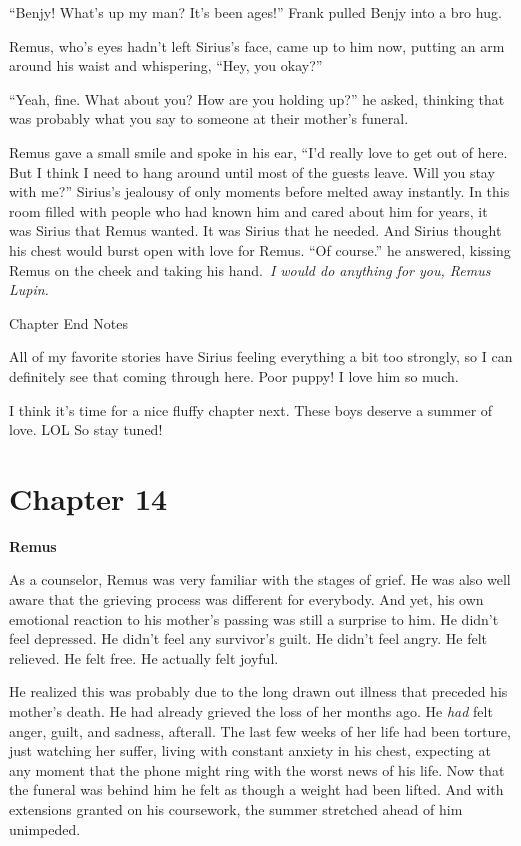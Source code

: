 \documentclass[12pt,twoside,openright]{memoir}
\begin{document}
``Benjy! What's up my man? It's been ages!'' Frank pulled Benjy into a bro hug. 

Remus, who's eyes hadn't left Sirius's face, came up to him now, putting an arm around his waist and whispering, ``Hey, you okay?''

``Yeah, fine. What about you? How are you holding up?'' he asked, thinking that was probably what you say to someone at their mother's funeral.

Remus gave a small smile and spoke in his ear, ``I'd really love to get out of here. But I think I need to hang around until most of the guests leave. Will you stay with me?'' Sirius's jealousy of only moments before melted away instantly. In this room filled with people who had known him and cared about him for years, it was Sirius that Remus wanted. It was Sirius that he needed. And Sirius thought his chest would burst open with love for Remus. ``Of course.'' he answered, kissing Remus on the cheek and taking his hand.\ \textit{I would do anything for you, Remus Lupin.}

Chapter End Notes

All of my favorite stories have Sirius feeling everything a bit too strongly, so I can definitely see that coming through here. Poor puppy! I love him so much. 

I think it's time for a nice fluffy chapter next. These boys deserve a summer of love. LOL So stay tuned!
\chapter*{Chapter 14}

\textbf{Remus} 

As a counselor, Remus was very familiar with the stages of grief. He was also well aware that the grieving process was different for everybody. And yet, his own emotional reaction to his mother's passing was still a surprise to him. He didn't feel depressed. He didn't feel any survivor's guilt. He didn't feel angry. He felt relieved. He felt free. He actually felt joyful.

He realized this was probably due to the long drawn out illness that preceded his mother's death. He had already grieved the loss of her months ago. He \textit{had} felt anger, guilt, and sadness, afterall. The last few weeks of her life had been torture, just watching her suffer, living with constant anxiety in his chest, expecting at any moment that the phone might ring with the worst news of his life. Now that the funeral was behind him he felt as though a weight had been lifted. And with extensions granted on his coursework, the summer stretched ahead of him unimpeded. 
\end{document}
